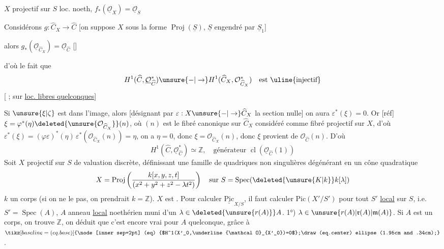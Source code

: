 $X$ projectif sur $S$ loc. noeth, \unsure{,} $f_*(\underline{\mathcal O}_X)=\underline{\mathcal O}_S$

Considérons $g:\widehat C_X\longrightarrow\widehat C$ [on suppose $X$ sous la forme $\operatorname{Proj}(\underline S)$,  $\underline S$ engendré par $\underline S_1$]

alors $g_*(\underline{\mathcal O}_{\widehat C_X})=\underline{\mathcal O}_{\widehat C}$ []

d'où le fait que
\[
H^1(\widehat C,\underline{\mathcal O}_{\widehat C}^*)\unsure{-|\to} H^1(\widehat C_X,\mathcal O_{\widehat C_X}^*)\quad\text{est \uline{injectif}}
\]
[  ; sur  \uline{loc. libres quelconques}]

Si  $\unsure{\xi|\zeta}$ est dans l'image, alors [désignant par $\varepsilon:X\unsure{-|\to}\widehat C_X$ la section nulle] on aura $\varepsilon^*(\xi)=0$. Or [réf] $\xi=\varphi^*(\eta)\deleted{\unsure{\mathcal O_{\widehat C_X}}}(n)$, où  $(n)$ est le fibré canonique sur $\widehat C_X$ considéré comme fibré projectif sur $X$, d'où $\varepsilon^*(\xi)=(\varphi\varepsilon)^*(\eta)\,\varepsilon^*(\mathcal O_{\widehat C_X}(n))=\eta$, on a $\eta=0$, donc $\xi=\mathcal O_{\widehat C_X}(n)$, donc $\xi$ provient de $\mathcal O_{\widehat C}(n)$. D'où
\[
\boxed{H^1(\widehat C,\underline{\mathcal O}_{\widehat C}^*)\simeq\mathbb Z,\quad\text{générateur }\operatorname{cl}(\underline{\mathcal O}_{\widehat C}(1))}
\]
Soit $X$  projectif sur $S$ de valuation discrète, définissant une famille de quadriques non singulières dégénérant en un cône quadratique
\[
X=\operatorname{Proj}\left(\frac{k[x,y,z,t]}{(x^2+y^2+z^2-\lambda t^2)}\right)\quad\text{sur }S=\operatorname{Spec}(\deleted{\unsure{K|k}}k[\lambda])
\]
 $k$ un corps (si on ne le  pas, on prendrait $k=\mathbb Z$). $X$ est  .  Pour calculer $\underline{\underline{\mathrm{Pic}}}_{X/S}$, il faut calculer $\mathrm{Pic}(X'/S')$ pour tout $S'$ \uline{local} sur $S$, i.e. $S'=\operatorname{Spec}(A)$, $A$ anneau \uline{local} noethérien muni d'un $\lambda\in\deleted{\unsure{r(A)}}A$. 1°) $\lambda\in\unsure{r(A)|\mathfrak r(A)|\mathfrak m(A)}$. Si $A$ est un corps, on trouve $\mathbb Z$,  on déduit que c'est encore vrai pour $A$ quelconque, grâce à $\tikz[baseline=(eq.base)]{\node[inner sep=2pt] (eq) {$H^1(X'_0,\underline{\mathcal O}_{X'_0})=0$};\draw (eq.center) ellipse (1.95cm and .34cm);}$.
